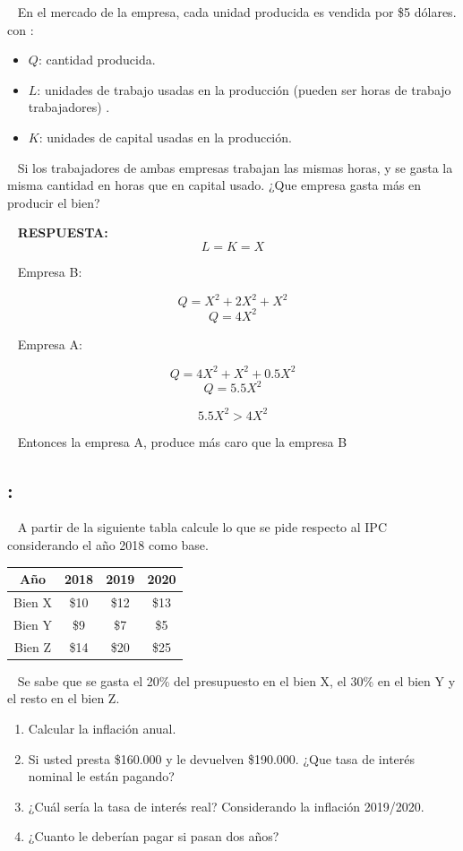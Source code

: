 \documentclass[
  letterpaper,
  DIV=11,
  numbers=noendperiod]{scrreport}
\providecommand{\tightlist}{%
  \setlength{\itemsep}{0pt}\setlength{\parskip}{0pt}}\usepackage{longtable,booktabs,array}
\begin{document}
~ En el mercado de la empresa, cada unidad producida es vendida por \$5
dólares. con :

\begin{itemize}
\tightlist
\item
  \(Q\): cantidad producida.
\item
  \(L\): unidades de trabajo usadas en la producción (pueden ser horas
  de trabajo trabajadores) .
\item
  \(K\): unidades de capital usadas en la producción.
\end{itemize}

~ Si los trabajadores de ambas empresas trabajan las mismas horas, y se
gasta la misma cantidad en horas que en capital usado. ¿Que empresa
gasta más en producir el bien?

~ \textbf{RESPUESTA:} \[L=K=X\]

~ Empresa B:

\[Q = X^2 + 2X^2 + X^2\] \[Q = 4X^2\]

~ Empresa A:

\[Q = 4X^2 + X^2 + 0.5X^2\] \[Q = 5.5X^2\]

\[5.5X^2 > 4X^2\]

~ Entonces la empresa A, produce más caro que la empresa B

\hypertarget{section-30}{%
\subsection{:}\label{section-30}}

~ A partir de la siguiente tabla calcule lo que se pide respecto al IPC
considerando el año 2018 como base.

\begin{table}[H]
    \centering
    \begin{tabular}{|c|c|c|c|}
    \hline
    Año & 2018 & 2019 & 2020 \\
    \hline
    Bien X & \$10 & \$12 & \$13 \\
    \hline
    Bien Y & \$9 & \$7 & \$5 \\
    \hline
    Bien Z & \$14 & \$20 & \$25 \\
    \hline
\end{tabular}
\end{table}

~ Se sabe que se gasta el 20\% del presupuesto en el bien X, el 30\% en
el bien Y y el resto en el bien Z.

\begin{enumerate}
\def\labelenumi{\alph{enumi})}
\item
  Calcular la inflación anual.
\item
  Si usted presta \$160.000 y le devuelven \$190.000. ¿Que tasa de
  interés nominal le están pagando?
\item
  ¿Cuál sería la tasa de interés real? Considerando la inflación
  2019/2020.
\item
  ¿Cuanto le deberían pagar si pasan dos años?
\end{enumerate}
\end{document}
